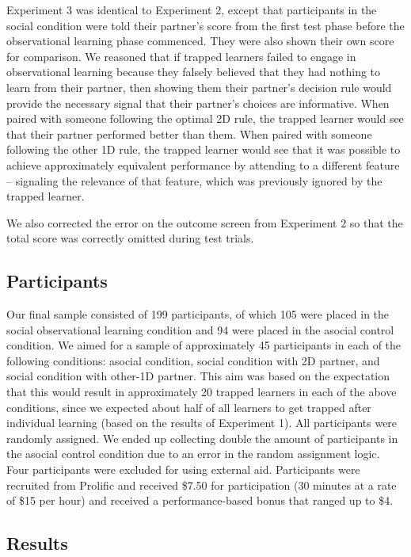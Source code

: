 \documentclass[11pt]{article} %
\begin{document}
Experiment 3 was identical to Experiment 2, except that participants in the social condition were told their partner's score from the first test phase before the observational learning phase commenced. They were also shown their own score for comparison. We reasoned that if trapped learners failed to engage in observational learning because they falsely believed that they had nothing to learn from their partner, then showing them their partner's decision rule would provide the necessary signal that their partner's choices are informative. When paired with someone following the optimal 2D rule, the trapped learner would see that their partner performed better than them. When paired with someone following the other 1D rule, the trapped learner would see that it was possible to achieve approximately equivalent performance by attending to a different feature -- signaling the relevance of that feature, which was previously ignored by the trapped learner. 

We also corrected the error on the outcome screen from Experiment 2 so that the total score was correctly omitted during test trials.

\subsection{Participants} 

Our final sample consisted of 199 participants, of which 105 were placed in the social observational learning condition and 94 were placed in the asocial control condition. We aimed for a sample of approximately 45 participants in each of the following conditions: asocial condition, social condition with 2D partner, and social condition with other-1D partner. This aim was based on the expectation that this would result in approximately 20 trapped learners in each of the above conditions, since we expected about half of all learners to get trapped after individual learning (based on the results of Experiment 1). All participants were randomly assigned. We ended up collecting double the amount of participants in the asocial control condition due to an error in the random assignment logic. Four participants were excluded for using external aid. Participants were recruited from Prolific and received \$7.50 for participation (30 minutes at a rate of \$15 per hour) and received a performance-based bonus that ranged up to \$4.

\subsection{Results} 
\end{document}
